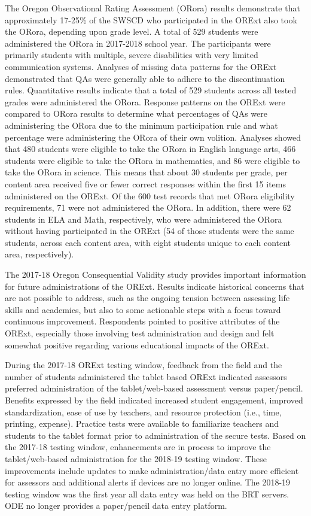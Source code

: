 \documentclass[]{article}
\begin{document}
The Oregon Observational Rating Assessment (ORora) results demonstrate
that approximately 17-25\% of the SWSCD who participated in the ORExt
also took the ORora, depending upon grade level. A total of 529 students
were administered the ORora in 2017-2018 school year. The participants
were primarily students with multiple, severe disabilities with very
limited communication systems. Analyses of missing data patterns for the
ORExt demonstrated that QAs were generally able to adhere to the
discontinuation rules. Quantitative results indicate that a total of 529
students across all tested grades were administered the ORora. Response
patterns on the ORExt were compared to ORora results to determine what
percentages of QAs were administering the ORora due to the minimum
participation rule and what percentage were administering the ORora of
their own volition. Analyses showed that 480 students were eligible to
take the ORora in English language arts, 466 students were eligible to
take the ORora in mathematics, and 86 were eligible to take the ORora in
science. This means that about 30 students per grade, per content area
received five or fewer correct responses within the first 15 items
administered on the ORExt. Of the 600 test records that met ORora
eligibility requirements, 71 were not administered the ORora. In
addition, there were 62 students in ELA and Math, respectively, who were
administered the ORora without having participated in the ORExt (54 of
those students were the same students, across each content area, with
eight students unique to each content area, respectively).

The 2017-18 Oregon Consequential Validity study provides important
information for future administrations of the ORExt. Results indicate
historical concerns that are not possible to address, such as the
ongoing tension between assessing life skills and academics, but also to
some actionable steps with a focus toward continuous improvement.
Respondents pointed to positive attributes of the ORExt, especially
those involving test administration and design and felt somewhat
positive regarding various educational impacts of the ORExt.

During the 2017-18 ORExt testing window, feedback from the field and the
number of students administered the tablet based ORExt indicated
assessors preferred administration of the tablet/web-based assessment
versus paper/pencil. Benefits expressed by the field indicated increased
student engagement, improved standardization, ease of use by teachers,
and resource protection (i.e., time, printing, expense). Practice tests
were available to familiarize teachers and students to the tablet format
prior to administration of the secure tests. Based on the 2017-18
testing window, enhancements are in process to improve the
tablet/web-based administration for the 2018-19 testing window. These
improvements include updates to make administration/data entry more
efficient for assessors and additional alerts if devices are no longer
online. The 2018-19 testing window was the first year all data entry was
held on the BRT servers. ODE no longer provides a paper/pencil data
entry platform.
\end{document}
